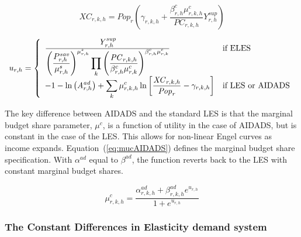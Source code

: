 \documentclass[11pt,letterpaper]{report}
\begin{document}
\begin{equation}
\label{eq:xcELES}
\mathit{XC}_{r,k,h} =
   \mathit{Pop}_r \left(
      \gamma_{r,k,h} + \frac{\beta^c_{r,h} \mu^c_{r,k,h}}
         {\mathit{PC}_{r,k,h}} \mathit{Y}^{sup}_{r,h}
   \right)
\end{equation}

\begin{equation}
\label{eq:uELES}
u_{r,h} =
   \left\{
      \begin{array}{l l}
         \frac {\displaystyle \mathit{Y}^{\mathit{sup}}_{r,h}}
            {\displaystyle{ \left(\frac{P^{\mathit{sav}}_{r,h}}{\mu^s_{r,h}}
               \right)^{\mu^s_{r,h}}}
               \prod_k{
                  \left(
                     \frac{\mathit{PC}_{r,k,h}} {\beta^c_{r,h}\mu^c_{r,k}}
                  \right)^{\beta^c_{r,h}\mu^c_{r,k}
               }
            }}
         & \textrm{if ELES} \\
         \displaystyle -1 - \ln{\left(\mathit{A}^{\mathit{ad}}_{r,h}\right)}
            +  \sum_k{ \mu^c_{r,k,h}
            \ln{\left[\frac{\mathit{XC}_{r,k,h}}{\mathit{Pop}_r}
            - \gamma_{r,k,h}\right]}}
         &  \textrm{if LES or AIDADS} \\
      \end{array}
   \right.
\end{equation}

The key difference between AIDADS and the standard LES is that the marginal
budget share parameter, $\mu^c$, is a function of utility in the case of AIDADS,
but is constant in the case of the LES. This allows for non-linear Engel curves
as income expands. Equation~(\ref{eq:mucAIDADS}) defines the marginal budget
share specification. With $\alpha^{\mathit{ad}}$ equal to $\beta^{\mathit{ad}}$,
the function reverts back to the LES with constant marginal budget shares.

\begin{equation}
\label{eq:mucAIDADS}
\mu^c_{r,k,h} =
   \frac {\alpha^{\mathit{ad}}_{r,k,h}
            + \beta^{\mathit{ad}}_{r,k,h} e^{{u_{r,h}}}}
         {1 + e^{{u_{r,h}}}}
\end{equation}

\subsubsection{The Constant Differences in Elasticity demand system}
\end{document}
